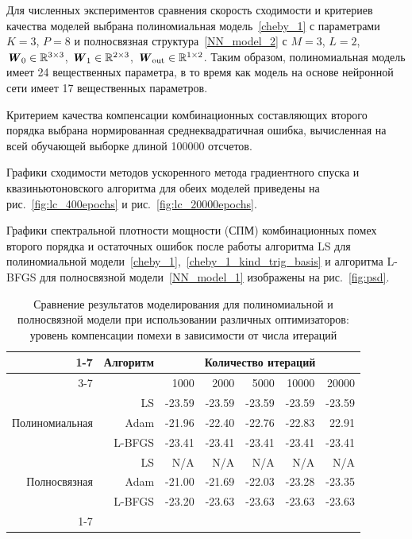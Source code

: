 Для численных экспериментов сравнения скорость сходимости и критериев качества моделей выбрана полиномиальная модель~\eqref{cheby_1} с параметрами $K=3$, $P=8$ и полносвязная структура~\eqref{NN_model_2} с $M=3$, $L=2$, $\textbf{\textit{W}}_{0} \in \mathbb{R}^{3\times 3}$, $\textbf{\textit{W}}_{1} \in \mathbb{R}^{2\times 3}$, $\textbf{\textit{W}}_{\text{out}} \in \mathbb{R}^{1\times 2}$. Таким образом, полиномиальная модель имеет 24 вещественных параметра, в то время как модель на основе нейронной сети имеет 17 вещественных параметров.

Критерием качества компенсации комбинационных составляющих второго порядка выбрана нормированная среднеквадратичная ошибка, вычисленная на всей обучающей выборке длиной 100000 отсчетов.

Графики сходимости методов ускоренного метода градиентного спуска и квазиньютоновского алгоритма для обеих моделей приведены на рис.~\ref{fig:lc_400epochs} и рис.~\ref{fig:lc_20000epochs}.

Графики спектральной плотности мощности (СПМ) комбинационных помех второго порядка и остаточных ошибок после работы алгоритма LS для полиномиальной модели~\eqref{cheby_1},~\eqref{cheby_1_kind_trig_basis} и алгоритма L-BFGS для полносвязной модели~\eqref{NN_model_1} изображены на рис.~\ref{fig:psd}.

\begin{table}[h]
	\centering
	\begin{tabular}{||r|r|r|r|r|r|r||}
		\cline{1-7}
		\multirow{2}{*}{Модель}&\multirow{2}{*}{Алгоритм}&\multicolumn{5}{c}{Количество итераций} \vline\\ \cline{3-7}
		& & 1000 & 2000 & 5000 & 10000 & 20000 \\
		\hline \hline
		& LS & -23.59 & -23.59 & -23.59 & -23.59 & -23.59 \\
		Полиномиальная & Adam & -21.96 & -22.40 & -22.76 & -22.83 & 22.91  \\
		& L-BFGS & -23.41 & -23.41 & -23.41 & -23.41 & -23.41 \\
		\hline\hline
		& LS & N/A & N/A & N/A & N/A & N/A \\
		Полносвязная & Adam & -21.00 & -21.69 & -22.03 & -23.28 & -23.35  \\
		& L-BFGS & -23.20 & -23.63 & -23.63 & -23.63 & -23.63 \\
		\cline{1-7}
	\end{tabular}
	\centering
	\captionsetup{justification=centering}
	\caption{Сравнение результатов моделирования для полиномиальной и полносвязной модели при использовании различных оптимизаторов: уровень компенсации помехи в зависимости от числа итераций}
	\label{tab:comparison}
\end{table}



